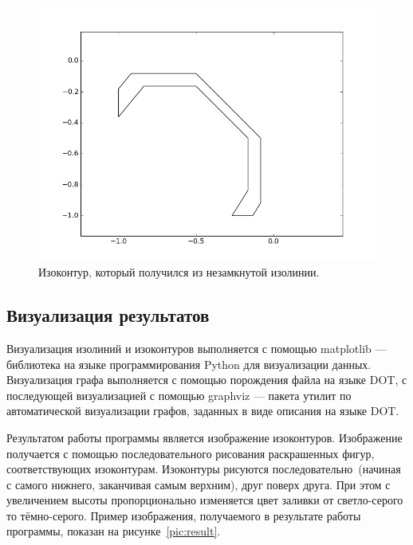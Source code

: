 \documentclass[12pt,a4paper,oneside]{extarticle}
\begin{document}
        \begin{figure}[h!]
            \center
            \includegraphics[scale=0.5]{contour.png}
            \caption{Изоконтур, который получился из незамкнутой изолинии.}
            \label{pic:contour}
        \end{figure}

    \subsection{Визуализация результатов}
        Визуализация изолиний и изоконтуров выполняется с помощью matplotlib --- библиотека на языке программирования Python для визуализации данных. Визуализация графа выполняется с помощью порождения файла на языке DOT, с последующей визуализацией с помощью graphviz --- пакета утилит по автоматической визуализации графов, заданных в виде описания на языке DOT.

        Результатом работы программы является изображение изоконтуров. Изображение получается с помощью последовательного рисования раскрашенных фигур, соответствующих изоконтурам. Изоконтуры рисуются последовательно~(начиная с самого нижнего, заканчивая самым верхним), друг поверх друга. При этом с увеличением высоты пропорционально изменяется цвет заливки от светло-серого то тёмно-серого. Пример изображения, получаемого в результате работы программы, показан на рисунке~\ref{pic:result}.
        
\end{document}
